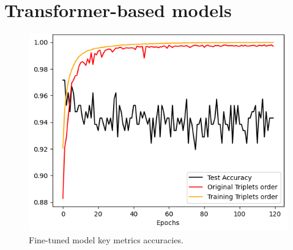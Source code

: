 \section{Transformer-based models}
\label{Transformer-based models}

\begin{figure}[]
    \centering
    \includegraphics[width=0.5\columnwidth]{images/key_metrics_evolution_openshape.png}
    \caption{Fine-tuned model key metrics accuracies.}
    \label{fig:key_metrics_evolution_openshape}
\end{figure}

